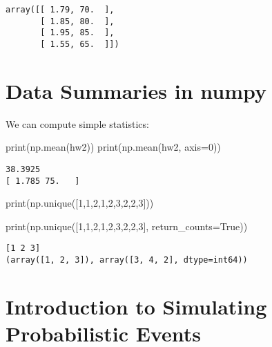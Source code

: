 \documentclass[
  letterpaper,
  DIV=11,
  numbers=noendperiod]{scrreprt}
\newenvironment{Shaded}{\begin{snugshade}}{\end{snugshade}}
\newcommand{\BuiltInTok}[1]{\textcolor[rgb]{0.00,0.23,0.31}{#1}}
\newcommand{\DecValTok}[1]{\textcolor[rgb]{0.68,0.00,0.00}{#1}}
\newcommand{\NormalTok}[1]{\textcolor[rgb]{0.00,0.23,0.31}{#1}}
\newcommand{\OperatorTok}[1]{\textcolor[rgb]{0.37,0.37,0.37}{#1}}
\newcommand{\VariableTok}[1]{\textcolor[rgb]{0.07,0.07,0.07}{#1}}
\begin{document}
\begin{verbatim}
array([[ 1.79, 70.  ],
       [ 1.85, 80.  ],
       [ 1.95, 85.  ],
       [ 1.55, 65.  ]])
\end{verbatim}

\hypertarget{data-summaries-in-numpy}{%
\section{Data Summaries in numpy}\label{data-summaries-in-numpy}}

We can compute simple statistics:

\begin{Shaded}
\begin{Highlighting}[]
\BuiltInTok{print}\NormalTok{(np.mean(hw2))}
\BuiltInTok{print}\NormalTok{(np.mean(hw2, axis}\OperatorTok{=}\DecValTok{0}\NormalTok{))}
\end{Highlighting}
\end{Shaded}

\begin{verbatim}
38.3925
[ 1.785 75.   ]
\end{verbatim}

\begin{Shaded}
\begin{Highlighting}[]
\BuiltInTok{print}\NormalTok{(np.unique([}\DecValTok{1}\NormalTok{,}\DecValTok{1}\NormalTok{,}\DecValTok{2}\NormalTok{,}\DecValTok{1}\NormalTok{,}\DecValTok{2}\NormalTok{,}\DecValTok{3}\NormalTok{,}\DecValTok{2}\NormalTok{,}\DecValTok{2}\NormalTok{,}\DecValTok{3}\NormalTok{]))}

\BuiltInTok{print}\NormalTok{(np.unique([}\DecValTok{1}\NormalTok{,}\DecValTok{1}\NormalTok{,}\DecValTok{2}\NormalTok{,}\DecValTok{1}\NormalTok{,}\DecValTok{2}\NormalTok{,}\DecValTok{3}\NormalTok{,}\DecValTok{2}\NormalTok{,}\DecValTok{2}\NormalTok{,}\DecValTok{3}\NormalTok{], return\_counts}\OperatorTok{=}\VariableTok{True}\NormalTok{))}
\end{Highlighting}
\end{Shaded}

\begin{verbatim}
[1 2 3]
(array([1, 2, 3]), array([3, 4, 2], dtype=int64))
\end{verbatim}

\hypertarget{introduction-to-simulating-probabilistic-events}{%
\section{\texorpdfstring{Introduction to \textbf{Simulating
Probabilistic
Events}}{Introduction to Simulating Probabilistic Events}}\label{introduction-to-simulating-probabilistic-events}}
\end{document}
